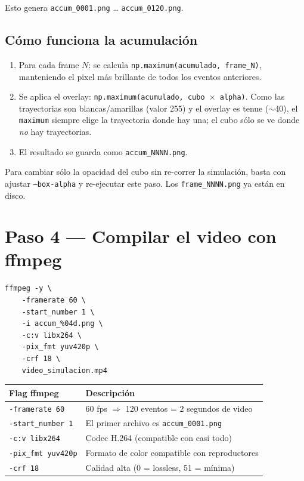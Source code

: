 \documentclass[11pt,a4paper]{article}
\begin{document}
Esto genera \texttt{accum\_0001.png} \ldots{} \texttt{accum\_0120.png}.

\subsection{Cómo funciona la acumulación}

\begin{enumerate}
  \item Para cada frame $N$: se calcula \texttt{np.maximum(acumulado, frame\_N)},
        manteniendo el pixel más brillante de todos los eventos anteriores.
  \item Se aplica el overlay: \texttt{np.maximum(acumulado, cubo $\times$ alpha)}.
        Como las trayectorias son blancas/amarillas (valor 255) y el overlay
        es tenue ($\sim$40), el \texttt{maximum} siempre elige la trayectoria
        donde hay una; el cubo sólo se ve donde \emph{no} hay trayectorias.
  \item El resultado se guarda como \texttt{accum\_NNNN.png}.
\end{enumerate}

\begin{tip}
  Para cambiar sólo la opacidad del cubo sin re-correr la simulación,
  basta con ajustar \texttt{--box-alpha} y re-ejecutar este paso.
  Los \texttt{frame\_NNNN.png} ya están en disco.
\end{tip}

\section{Paso 4 — Compilar el video con ffmpeg}

\begin{lstlisting}[style=console, caption={Compilar video MP4 — desde build/}]
ffmpeg -y \
    -framerate 60 \
    -start_number 1 \
    -i accum_%04d.png \
    -c:v libx264 \
    -pix_fmt yuv420p \
    -crf 18 \
    video_simulacion.mp4
\end{lstlisting}

\begin{center}
\begin{tabular}{lp{8.5cm}}
  \toprule
  \textbf{Flag ffmpeg} & \textbf{Descripción} \\
  \midrule
  \texttt{-framerate 60}   & 60 fps $\Rightarrow$ 120 eventos = 2 segundos de video \\
  \texttt{-start\_number 1} & El primer archivo es \texttt{accum\_0001.png} \\
  \texttt{-c:v libx264}    & Codec H.264 (compatible con casi todo) \\
  \texttt{-pix\_fmt yuv420p} & Formato de color compatible con reproductores \\
  \texttt{-crf 18}         & Calidad alta (0 = lossless, 51 = mínima) \\
  \bottomrule
\end{tabular}
\end{center}
\end{document}

